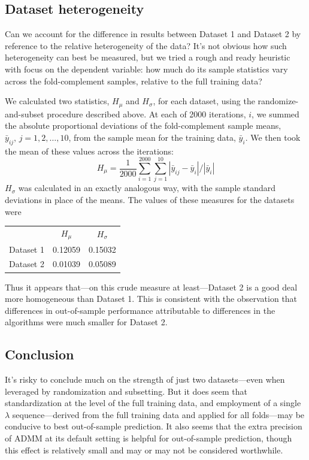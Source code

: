 \documentclass{article}
\begin{document}
\subsection*{Dataset heterogeneity}

Can we account for the difference in results between Dataset 1 and
Dataset 2 by reference to the relative heterogeneity of the data?
It's not obvious how such heterogeneity can best be measured, but we
tried a rough and ready heuristic with focus on the dependent
variable: how much do its sample statistics vary across the
fold-complement samples, relative to the full training data?

We calculated two statistics, $H_\mu$ and $H_\sigma$, for each
dataset, using the randomize-and-subset procedure described above.  At
each of 2000 iterations, $i$, we summed the absolute proportional
deviations of the fold-complement sample means,
$\bar{y}_{ij},\, j=1,2,\dots,10$, from the sample mean for the
training data, $\bar{y}_i$. We then took the mean of these values
across the iterations:
\[
  H_\mu = \frac{1}{2000} \sum_{i=1}^{2000} \sum_{j=1}^{10} |\bar{y}_{ij} - \bar{y}_i|/|\bar{y}_i|
\]
$H_\sigma$ was calculated in an exactly analogous way, with the sample
standard deviations in place of the means.  The values of these
measures for the datasets were
\begin{center}
  \begin{tabular}{lcc}
    & $H_\mu$ & $H_\sigma$ \\
    Dataset 1 & 0.12059 & 0.15032 \\
    Dataset 2 & 0.01039 & 0.05089
  \end{tabular}
\end{center}
Thus it appears that---on this crude measure at least---Dataset 2 is a
good deal more homogeneous than Dataset 1. This is consistent with the
observation that differences in out-of-sample performance attributable
to differences in the algorithms were much smaller for Dataset 2.

\subsection*{Conclusion}

It's risky to conclude much on the strength of just two
datasets---even when leveraged by randomization and subsetting. But it
does seem that standardization at the level of the full training data,
and employment of a single $\lambda$ sequence---derived from the full
training data and applied for all folds---may be conducive to best
out-of-sample prediction. It also seems that the extra precision of
ADMM at its default setting is helpful for out-of-sample prediction,
though this effect is relatively small and may or may not be
considered worthwhile.
\end{document}
